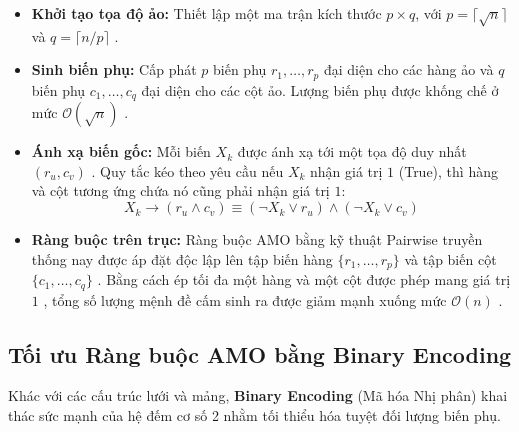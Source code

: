 \documentclass[a4paper,fleqn,numbers]{cas-sc}
\begin{document}
    \begin{itemize}
        \item \textbf{Khởi tạo tọa độ ảo:} Thiết lập một ma trận kích thước $p \times q$, với $p = \lceil\sqrt{n}\rceil$
        và $q = \lceil n/p \rceil$ \cite{ref_2}.
        \item \textbf{Sinh biến phụ:} Cấp phát $p$ biến phụ $r_1, \dots, r_p$ đại diện cho các hàng ảo và $q$ biến phụ
        $c_1, \dots, c_q$ đại diện cho các cột ảo. Lượng biến phụ được khống chế ở mức $\mathcal{O}(\sqrt{n})$
        \cite{ref_3}.
        \item \textbf{Ánh xạ biến gốc:} Mỗi biến $X_k$ được ánh xạ tới một tọa độ duy nhất $(r_u, c_v)$ \cite{ref_2}
        . Quy tắc kéo theo yêu cầu nếu $X_k$ nhận giá trị $1$
        (True), thì hàng và cột tương ứng chứa nó cũng phải nhận giá trị $1$:
        \begin{equation}\label{eq:product_mapping}
            X_k \to (r_u \land c_v) \equiv (\neg X_k \lor r_u) \land (\neg X_k \lor c_v)
        \end{equation}
        \item \textbf{Ràng buộc trên trục:}
        Ràng buộc AMO bằng kỹ thuật Pairwise truyền thống nay được áp đặt độc lập lên tập biến hàng
        $\{r_1, \dots, r_p\}$ và tập biến cột $\{c_1, \dots, c_q\}$
        . Bằng cách ép tối đa một hàng và một cột được phép mang giá trị $1$
        , tổng số lượng mệnh đề cấm sinh ra được giảm mạnh xuống mức $\mathcal{O}(n)$ \cite{ref_3}.

    \end{itemize}

    \subsection{Tối ưu Ràng buộc AMO bằng Binary Encoding}\label{subsec:amo_binary}
    Khác với các cấu trúc lưới và mảng, \textbf{Binary Encoding} (Mã hóa Nhị phân)
    khai thác sức mạnh của hệ đếm cơ số 2 nhằm tối thiểu hóa tuyệt đối lượng biến phụ.
\end{document}
